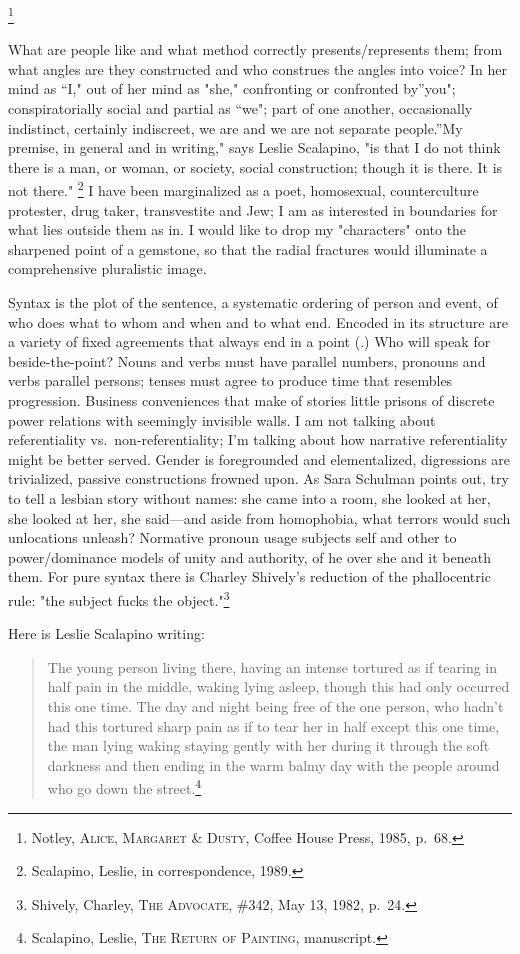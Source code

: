 \documentclass[
]{memoir}
\newlength{\drop}%
\begin{document}
\footnote{Notley, \textsc{Alice, Margaret \& Dusty}, Coffee House Press,
  1985, p.~68.}

What are people like and what method correctly presents/represents them;
from what angles are they constructed and who construes the angles into
voice? In her mind as ``I," out of her mind as "she," confronting or
confronted by''you"; conspiratorially social and partial as ``we"; part
of one another, occasionally indistinct, certainly indiscreet, we are
and we are not separate people.''My premise, in general and in writing,"
says Leslie Scalapino, "is that I do not think there is a man, or woman,
or society, social construction; though it is there. It is not there."
\footnote{Scalapino, Leslie, in correspondence, 1989.} I have been
marginalized as a poet, homosexual, counterculture protester, drug
taker, transvestite and Jew; I am as interested in boundaries for what
lies outside them as in. I would like to drop my "characters" onto the
sharpened point of a gemstone, so that the radial fractures would
illuminate a comprehensive pluralistic image.

Syntax is the plot of the sentence, a systematic ordering of person and
event, of who does what to whom and when and to what end. Encoded in its
structure are a variety of fixed agreements that always end in a point
(.) Who will speak for beside-the-point? Nouns and verbs must have
parallel numbers, pronouns and verbs parallel persons; tenses must agree
to produce time that resembles progression. Business conveniences that
make of stories little prisons of discrete power relations with
seemingly invisible walls. I am not talking about referentiality
vs.~non-referentiality; I'm talking about how narrative referentiality
might be better served. Gender is foregrounded and elementalized,
digressions are trivialized, passive constructions frowned upon. As Sara
Schulman points out, try to tell a lesbian story without names: she came
into a room, she looked at her, she looked at her, she said---and aside
from homophobia, what terrors would such unlocations unleash? Normative
pronoun usage subjects self and other to power/dominance models of unity
and authority, of he over she and it beneath them. For pure syntax there
is Charley Shively's reduction of the phallocentric rule: "the subject
fucks the object."\footnote{Shively, Charley, \textsc{The Advocate},
  \#342, May 13, 1982, p.~24.}

Here is Leslie Scalapino writing:

\begin{quote}
The young person living there, having an intense tortured as if tearing
in half pain in the middle, waking lying asleep, though this had only
occurred this one time. The day and night being free of the one person,
who hadn't had this tortured sharp pain as if to tear her in half except
this one time, the man lying waking staying gently with her during it
through the soft darkness and then ending in the warm balmy day with the
people around who go down the street.\footnote{Scalapino, Leslie,
  \textsc{The Return of Painting}, manuscript.}
\end{quote}
\end{document}
